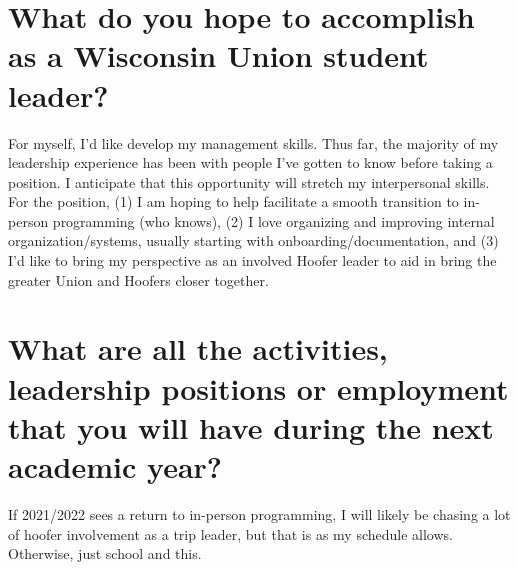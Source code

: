 \documentclass[12pt]{article}
\begin{document}
\section{What do you hope to accomplish as a Wisconsin Union student leader?}

    For myself, I'd like develop my management skills. Thus far, the majority of my leadership experience has been with people I've gotten to know before taking a position.  I anticipate that this opportunity will stretch my interpersonal skills. For the position, (1) I am hoping to help facilitate a smooth transition to in-person programming (who knows), (2) I love organizing and improving internal organization/systems, usually starting with onboarding/documentation, and (3) I'd like to bring my perspective as an involved Hoofer leader to aid in bring the greater Union and Hoofers closer together.

\section{What are all the activities, leadership positions or employment that you will have during the next academic year?}

    If 2021/2022 sees a return to in-person programming, I will likely be chasing a lot of hoofer involvement as a trip leader, but that is as my schedule allows. Otherwise, just school and this.
\end{document}

